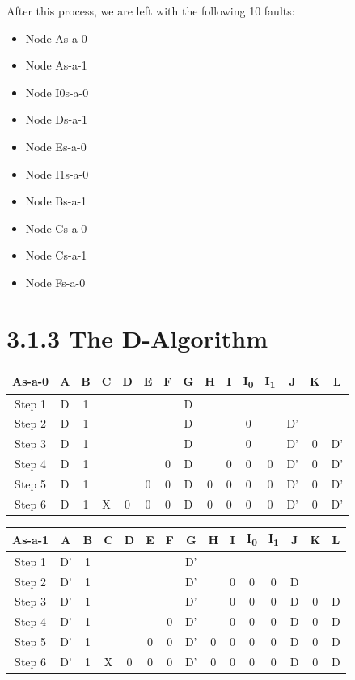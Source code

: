\documentclass[11pt]{report}
\begin{document}
After this process, we are left with the following 10 faults:
\begin{itemize}
    \item Node As-a-0
    \item Node As-a-1
    \item Node I0s-a-0
    \item Node Ds-a-1
    \item Node Es-a-0
    \item Node I1s-a-0
    \item Node Bs-a-1
    \item Node Cs-a-0
    \item Node Cs-a-1
    \item Node Fs-a-0
\end{itemize}


\section*{3.1.3 The D-Algorithm}

\begin{tabular}{ |c||c|c|c|c|c|c|c|c|c|c|c|c|c|c|}
\hline
\bf As-a-0 & \bf A & \bf B & \bf C & \bf D & \bf E & \bf F & G & H & I & I\textsubscript{0} & I\textsubscript{1} & J & K & \bf L \\
\hline
\hline
Step 1 & D & 1 & & & & & D & & & & & & & \\
\hline
Step 2 & D & 1 & & & & & D & & & 0 & & D' & & \\
\hline
Step 3 & D & 1 & & & & & D & & & 0 & & D' & 0 & D' \\
\hline
Step 4 & D & 1 & & & & 0 & D & & 0 & 0 & 0 & D' & 0 & D' \\
\hline
Step 5 & D & 1 & & & 0 & 0 & D & 0 & 0 & 0 & 0 & D' & 0 & D' \\
\hline
Step 6 & D & 1 & X & 0 & 0 & 0 & D & 0 & 0 & 0 & 0 & D' & 0 & D' \\
\hline
\end{tabular}


\begin{tabular}{ |c||c|c|c|c|c|c|c|c|c|c|c|c|c|c| }
\hline
\bf As-a-1 & \bf A & \bf B & \bf C & \bf D & \bf E & \bf F & G & H & I & I\textsubscript{0} & I\textsubscript{1} & J & K & \bf L \\
\hline
\hline
Step 1 & D' & 1 & & & & & D' & & & & & & & \\
\hline
Step 2 & D' & 1 & & & & & D' & & 0 & 0 & 0 & D & & \\
\hline
Step 3 & D' & 1 & & & & & D' & & 0 & 0 & 0 & D & 0 & D \\
\hline
Step 4 & D' & 1 & & & & 0 & D' & & 0 & 0 & 0 & D & 0 & D \\
\hline
Step 5 & D' & 1 & & & 0 & 0 & D' & 0 & 0 & 0 & 0 & D & 0 & D \\
\hline
Step 6 & D' & 1 & X & 0 & 0 & 0 & D' & 0 & 0 & 0 & 0 & D & 0 & D \\
\hline
\end{tabular}
\end{document}
